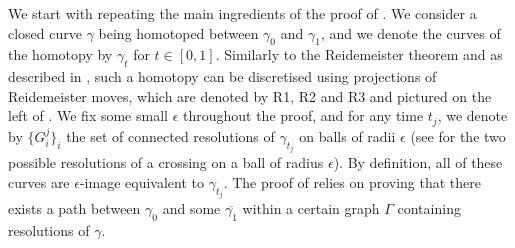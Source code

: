 \documentclass[10pt,a4paper]{amsart}
\begin{document}
We start with repeating the main ingredients of the proof of . We consider a closed curve $\gamma$ being homotoped between $\gamma_0$ and $\gamma_1$, and we denote the curves of the homotopy by $\gamma_t$ for $t\in [0,1]$. Similarly to the Reidemeister theorem and as described in \cite[Proposition 2.1]{Chambers_homo-isotopy}, such a homotopy can be discretised using projections of Reidemeister moves, which are denoted by R1, R2 and R3 and pictured on the left of . We fix some small $\epsilon$ throughout the proof, and for any time $t_j$, we denote by $\{ G^j_i \}_i$ the set of connected resolutions of $\gamma_{t_j}$ on balls of radii $\epsilon$ (see  for the two possible resolutions of a crossing on a ball of radius $\epsilon$). By definition, all of these curves are $\epsilon$-image equivalent to $\gamma_{t_j}$. The proof of  relies on proving that there exists a path between $\gamma_0$ and some $\overline{\gamma_1}$ within a certain graph $\Gamma$ containing resolutions of $\gamma$.
\end{document}

